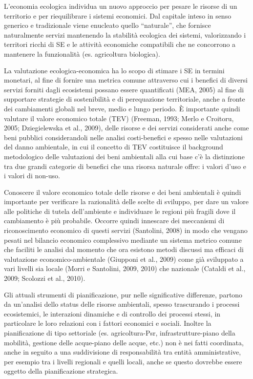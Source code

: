 \documentclass[11pt,a4paper]{article}
\begin{document}
	L'economia ecologica individua un nuovo approccio per pesare le risorse di un territorio e per riequilibrare i sistemi economici. Dal capitale inteso in senso generico e tradizionale viene enucleato quello ``naturale'', che fornisce naturalmente servizi mantenendo la stabilità ecologica dei sistemi, valorizzando i territori ricchi di SE e le attività economiche compatibili che ne concorrono a mantenere la funzionalità (es. agricoltura biologica). 
	
	La valutazione ecologica-economica ha lo scopo di stimare i SE in termini monetari, al fine di fornire una metrica comune
	attraverso cui i benefici di diversi servizi forniti dagli ecosistemi possano essere quantificati (MEA, 2005) al fine di
	supportare strategie di sostenibilità e di perequazione territoriale, anche a fronte dei cambiamenti globali nel breve, medio e lungo periodo. È importante quindi valutare il valore economico totale (TEV) (Freeman, 1993; Merlo e Croitoru, 2005; Dziegielewska et al., 2009), delle risorse e dei servizi considerati anche come beni pubblici considerandoli nelle analisi costi-benefici e spesso nelle valutazioni del danno ambientale, in cui il concetto di TEV costituisce il background
	metodologico delle valutazioni dei beni ambientali alla cui base c'è la distinzione tra due grandi categorie di benefici che una risorsa naturale offre: i valori d'uso e i valori di non-uso.  
	
	Conoscere il valore economico totale delle risorse e dei beni ambientali è quindi importante per verificare la razionalità delle scelte di sviluppo, per dare un valore alle politiche di tutela dell'ambiente e individuare le regioni più fragili dove il cambiamento è più probabile. Occorre quindi innescare dei meccanismi di riconoscimento economico di questi servizi (Santolini, 2008) in modo che vengano pesati nel bilancio economico complessivo mediante un sistema metrico comune che  faciliti le analisi dal momento che ora esistono metodi discussi ma efficaci di valutazione economico-ambientale (Giupponi et al., 2009) come già sviluppato a vari livelli sia locale (Morri e Santolini, 2009, 2010) che nazionale (Cataldi et al., 2009; Scolozzi et al., 2010). 
	
	Gli attuali strumenti di pianificazione, pur nelle significative differenze, partono da un'analisi dello status delle risorse ambientali, spesso trascurando i processi ecosistemici, le interazioni dinamiche e di controllo dei processi stessi, in particolare le loro relazioni con i fattori economici e sociali. Inoltre la pianificazione di tipo settoriale (es. agricoltura-Psr, infrastrutture-piano della mobilità, gestione delle acque-piano delle acque, etc.) non è nei fatti coordinata, anche in seguito a una suddivisione di responsabilità tra entità amministrative, per esempio tra i livelli regionali e quelli 	locali, anche se questo dovrebbe essere oggetto della pianificazione strategica. 
	
\end{document}
